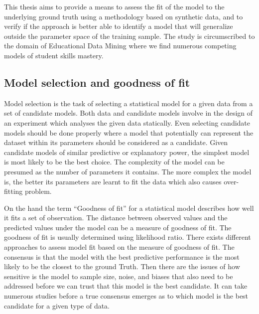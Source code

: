 This thesis aims to provide a means to assess the fit of the model to the underlying ground truth using a methodology based on synthetic data, and to verify if the approach is better able to identify a model that will generalize outside the parameter space of the training sample.  The study is circumscribed to the domain of Educational Data Mining where we find numerous competing models of student skills mastery.

\subsection{Model selection and goodness of fit}

Model selection is the task of selecting a statistical model for a given data from a set of candidate models. Both data and candidate models involve in the design of an experiment which analyses the given data statically. Even selecting candidate models should be done properly where a model that potentially can represent the dataset within its parameters should be considered as a candidate. Given candidate models of similar predictive or explanatory power, the simplest model is most likely to be the best choice. The complexity of the model can be presumed as the number of parameters it contains. The more complex the model is, the better its parameters are learnt to fit the data which also causes over-fitting problem.


On the hand the term ``Goodness of fit''  for a statistical model describes how well it fits a set of observation. The distance between observed values and the predicted values under the model can be a measure of goodness of fit. The goodness of fit is usually determined using likelihood ratio. There exists different approaches to assess model fit based on the measure of goodness of fit. The consensus is that the model with the best predictive performance is the most likely to be the closest to the ground Truth. Then there are the issues of how sensitive is the model to sample size, noise, and biases that also need to be addressed before we can trust that this model is the best candidate. It can take numerous studies before a true consensus emerges as to which model is the best candidate for a given type of data.


